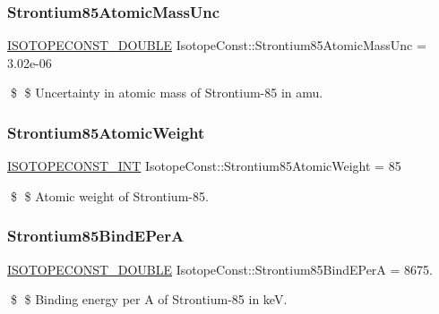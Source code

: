 \subsubsection{\texorpdfstring{Strontium85\+Atomic\+Mass\+Unc}{Strontium85AtomicMassUnc}}
{\footnotesize\ttfamily \mbox{\hyperlink{group___isotope_const-_macros_ga8f45a7272ce02c0b4c65c44636ed719a}{I\+S\+O\+T\+O\+P\+E\+C\+O\+N\+S\+T\+\_\+\+D\+O\+U\+B\+LE}} Isotope\+Const\+::\+Strontium85\+Atomic\+Mass\+Unc = 3.\+02e-\/06}

\$ \$ Uncertainty in atomic mass of Strontium-\/85 in amu. \mbox{\label{group___isotope_const-_strontium-_sr85_ga2f45aa666a692a9ab9f7857642e8bf94}} 
\subsubsection{\texorpdfstring{Strontium85\+Atomic\+Weight}{Strontium85AtomicWeight}}
{\footnotesize\ttfamily \mbox{\hyperlink{group___isotope_const-_macros_ga5f18360b3e99483a35c32d789e62621c}{I\+S\+O\+T\+O\+P\+E\+C\+O\+N\+S\+T\+\_\+\+I\+NT}} Isotope\+Const\+::\+Strontium85\+Atomic\+Weight = 85}

\$ \$ Atomic weight of Strontium-\/85. \mbox{\label{group___isotope_const-_strontium-_sr85_ga689c8ef99671afe8bb854c08cbd1ac98}} 
\subsubsection{\texorpdfstring{Strontium85\+Bind\+E\+PerA}{Strontium85BindEPerA}}
{\footnotesize\ttfamily \mbox{\hyperlink{group___isotope_const-_macros_ga8f45a7272ce02c0b4c65c44636ed719a}{I\+S\+O\+T\+O\+P\+E\+C\+O\+N\+S\+T\+\_\+\+D\+O\+U\+B\+LE}} Isotope\+Const\+::\+Strontium85\+Bind\+E\+PerA = 8675.}

\$ \$ Binding energy per A of Strontium-\/85 in keV. \mbox{\label{group___isotope_const-_strontium-_sr85_ga59714051cd5c786f7ca50049c3525ae4}} 
